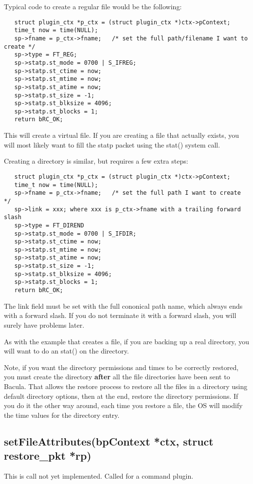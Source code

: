 Typical code to create a regular file would be the following:

\begin{verbatim}
   struct plugin_ctx *p_ctx = (struct plugin_ctx *)ctx->pContext;
   time_t now = time(NULL);
   sp->fname = p_ctx->fname;   /* set the full path/filename I want to create */
   sp->type = FT_REG;
   sp->statp.st_mode = 0700 | S_IFREG;
   sp->statp.st_ctime = now;
   sp->statp.st_mtime = now;
   sp->statp.st_atime = now;
   sp->statp.st_size = -1;
   sp->statp.st_blksize = 4096;
   sp->statp.st_blocks = 1;
   return bRC_OK;
\end{verbatim}

This will create a virtual file.  If you are creating a file that actually
exists, you will most likely want to fill the statp packet using the
stat() system call.

Creating a directory is similar, but requires a few extra steps:

\begin{verbatim}
   struct plugin_ctx *p_ctx = (struct plugin_ctx *)ctx->pContext;
   time_t now = time(NULL);
   sp->fname = p_ctx->fname;   /* set the full path I want to create */
   sp->link = xxx; where xxx is p_ctx->fname with a trailing forward slash
   sp->type = FT_DIREND
   sp->statp.st_mode = 0700 | S_IFDIR;
   sp->statp.st_ctime = now;
   sp->statp.st_mtime = now;
   sp->statp.st_atime = now;
   sp->statp.st_size = -1;
   sp->statp.st_blksize = 4096;
   sp->statp.st_blocks = 1;
   return bRC_OK;
\end{verbatim}

The link field must be set with the full cononical path name, which always
ends with a forward slash.  If you do not terminate it with a forward slash,
you will surely have problems later.

As with the example that creates a file, if you are backing up a real
directory, you will want to do an stat() on the directory.

Note, if you want the directory permissions and times to be correctly
restored, you must create the directory {\bf after} all the file directories
have been sent to Bacula. That allows the restore process to restore all the
files in a directory using default directory options, then at the end, restore
the directory permissions.  If you do it the other way around, each time you
restore a file, the OS will modify the time values for the directory entry.

\subsection{setFileAttributes(bpContext *ctx, struct restore\_pkt *rp)}
This is call not yet implemented.  Called for a command plugin.

